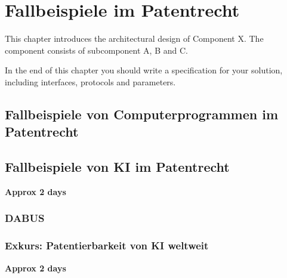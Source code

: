 \chapter{Fallbeispiele im Patentrecht\label{cha:chapter4}}
This chapter introduces the architectural design of Component X. The component consists of subcomponent A, B and C.

In the end of this chapter you should write a specification for your solution, including interfaces, protocols and parameters.
\section{Fallbeispiele von Computerprogrammen im Patentrecht\label{sec:conceptsubb}}

\section{Fallbeispiele von KI im Patentrecht\label{sec:conceptsuba}}
\textbf{Approx 2 days}
\subsection{DABUS}


\subsection{Exkurs: Patentierbarkeit von KI weltweit}
\textbf{Approx 2 days}


